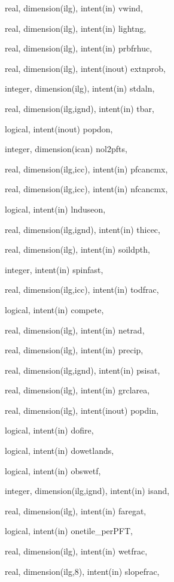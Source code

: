 {\begin{DoxyParamCaption}
\item[{real, dimension(ilg), intent(in)}]{vwind, }
\item[{real, dimension(ilg), intent(in)}]{lightng, }
\item[{real, dimension(ilg), intent(in)}]{prbfrhuc, }
\item[{real, dimension(ilg), intent(inout)}]{extnprob, }
\item[{integer, dimension(ilg), intent(in)}]{stdaln, }
\item[{real, dimension(ilg,ignd), intent(in)}]{tbar, }
\item[{logical, intent(inout)}]{popdon, }
\item[{integer, dimension(ican)}]{nol2pfts, }
\item[{real, dimension(ilg,icc), intent(in)}]{pfcancmx, }
\item[{real, dimension(ilg,icc), intent(in)}]{nfcancmx, }
\item[{logical, intent(in)}]{lnduseon, }
\item[{real, dimension(ilg,ignd), intent(in)}]{thicec, }
\item[{real, dimension(ilg), intent(in)}]{soildpth, }
\item[{integer, intent(in)}]{spinfast, }
\item[{real, dimension(ilg,icc), intent(in)}]{todfrac, }
\item[{logical, intent(in)}]{compete, }
\item[{real, dimension(ilg), intent(in)}]{netrad, }
\item[{real, dimension(ilg), intent(in)}]{precip, }
\item[{real, dimension(ilg,ignd), intent(in)}]{psisat, }
\item[{real, dimension(ilg), intent(in)}]{grclarea, }
\item[{real, dimension(ilg), intent(inout)}]{popdin, }
\item[{logical, intent(in)}]{dofire, }
\item[{logical, intent(in)}]{dowetlands, }
\item[{logical, intent(in)}]{obswetf, }
\item[{integer, dimension(ilg,ignd), intent(in)}]{isand, }
\item[{real, dimension(ilg), intent(in)}]{faregat, }
\item[{logical, intent(in)}]{onetile\+\_\+per\+P\+F\+T, }
\item[{real, dimension(ilg), intent(in)}]{wetfrac, }
\item[{real, dimension(ilg,8), intent(in)}]{slopefrac, }

\end{DoxyParamCaption}}
